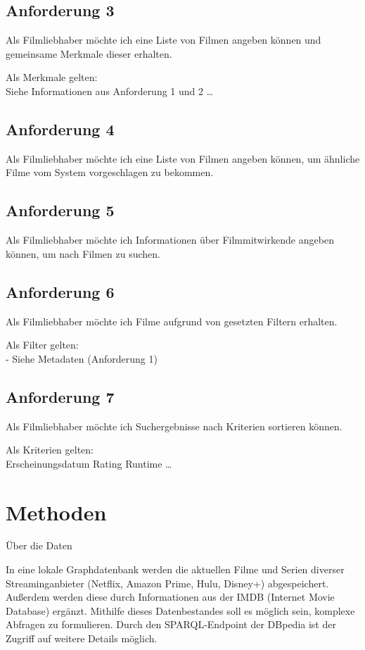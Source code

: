 \documentclass[conference]{IEEEtran}
\begin{document}
\subsection{Anforderung 3}

Als Filmliebhaber möchte ich eine Liste von Filmen angeben können
und gemeinsame Merkmale dieser erhalten.

Als Merkmale gelten:
\\
Siehe Informationen aus Anforderung 1 und 2
\dots
\\

\subsection{Anforderung 4}

Als Filmliebhaber möchte ich eine Liste von Filmen angeben können,
um ähnliche Filme vom System vorgeschlagen zu bekommen.


\subsection{Anforderung 5}
Als Filmliebhaber möchte ich Informationen über Filmmitwirkende angeben können,
um nach Filmen zu suchen.

\subsection{Anforderung 6}

Als Filmliebhaber möchte ich Filme aufgrund von gesetzten Filtern erhalten.

Als Filter gelten:
\\
- Siehe Metadaten (Anforderung 1)

\subsection{Anforderung 7}

Als Filmliebhaber möchte ich Suchergebnisse nach Kriterien sortieren können.

Als Kriterien gelten:
\\
Erscheinungsdatum
Rating
Runtime
\dots
\\

\section{Methoden}

Über die Daten

In eine lokale Graphdatenbank werden die aktuellen Filme und Serien diverser Streaminganbieter (Netflix, Amazon Prime, Hulu, Disney+) abgespeichert. Außerdem werden diese durch Informationen aus der IMDB (Internet Movie Database) ergänzt. Mithilfe dieses Datenbestandes soll es möglich sein, komplexe Abfragen zu formulieren. Durch den SPARQL-Endpoint der DBpedia ist der Zugriff auf weitere Details möglich.
\end{document}
